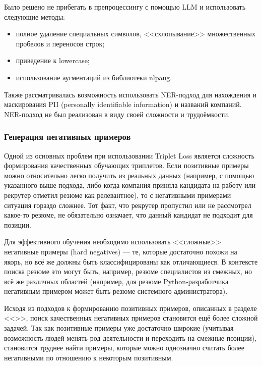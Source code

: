 \documentclass[14pt]{mmcs_article}
\begin{document}
Было решено не прибегать в препроцессингу с помощью LLM и использовать следующие методы:

\begin{itemize}
  \item полное удаление специальных символов, <<схлопывание>> множественных пробелов и переносов строк;
  \item приведение к lowercase;
  \item использование аугментаций из библиотеки nlpaug\cite{ma2019nlpaug}.
\end{itemize}

Также рассматривалась возможность использовать NER-подход для нахождения и маскирования PII (personally identifiable information) и названий компаний. NER-подход не был реализован в виду своей сложности и трудоёмкости.

\subsubsection*{Генерация негативных примеров}

Одной из основных проблем при использовании Triplet Loss является сложность формирования качественных обучающих триплетов. Если позитивные примеры можно относительно легко получить из реальных данных (например, с помощью указанного выше подхода, либо когда компания приняла кандидата на работу или рекрутер отметил резюме как релевантное), то с негативными примерами ситуация гораздо сложнее. Тот факт, что рекрутер пропустил или не рассмотрел какое-то резюме, не обязательно означает, что данный кандидат не подходит для позиции.

Для эффективного обучения необходимо использовать <<сложные>> негативные примеры (hard negatives)\cite{xuan2021hardnegativeexampleshard} --- те, которые достаточно похожи на якорь, но всё же должны быть классифицированы как отличающиеся. В контексте поиска резюме это могут быть, например, резюме специалистов из смежных, но всё же различных областей (например, для резюме Python-разработчика негативным примером может быть резюме системного администратора).

Исходя из подходов к формированию позитивных примеров, описанных в разделе <<>>, поиск качественных негативных примеров становится ещё более сложной задачей. Так как позитивные примеры уже достаточно широкие (учитывая возможность людей менять род деятельности и переходить на смежные позиции), становится труднее найти примеры, которые можно однозначно считать более негативными по отношению к некоторым позитивным.
\end{document}
